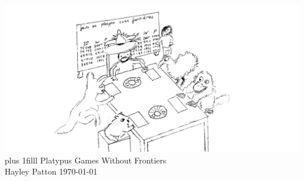 \documentclass[aspectratio=169]{beamer}
\newcommand{\btVFill}{\vskip0pt plus 1filll}
\begin{document}
\begin{frame}
  \includegraphics[width=\textwidth]{jeux-sans-frontieres.jpg}
  \btVFill
  {\huge{} Platypus Games Without Frontiers} \\
  \vspace{0.5em}
  Hayley Patton \hfill \today
  \vspace{0.5em}
\end{frame}
\end{document}
